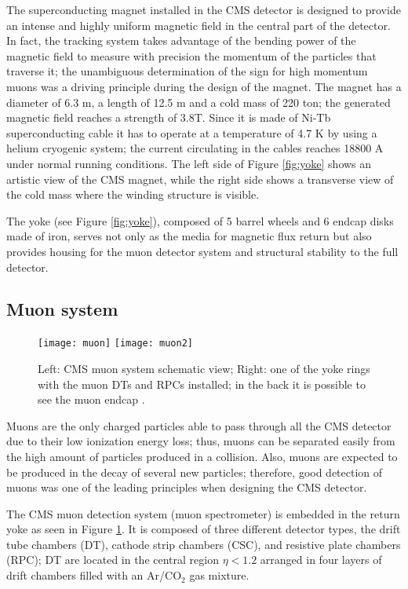 The superconducting magnet installed in the CMS detector is designed to provide an intense and highly uniform magnetic field in the central part of the detector. In fact, the tracking system takes advantage of the bending power of the magnetic field to measure with precision the momentum of the particles that traverse it; the unambiguous determination of the sign for high momentum muons was a driving principle during the design of the magnet. The magnet has a diameter of 6.3 m, a length of 12.5 m and a cold mass of 220 ton; the generated magnetic field reaches a strength of 3.8T. Since it is made of Ni-Tb superconducting cable it has to operate at a temperature of 4.7 K by using a helium cryogenic system; the current circulating in the cables reaches 18800 A under normal running conditions. The left side of Figure \ref{fig:yoke} shows an artistic view of the CMS magnet, while the right side shows a transverse view of the cold mass where the winding structure is visible.

The yoke (see Figure \ref{fig:yoke}), composed of 5 barrel wheels and 6 endcap disks made of iron, serves not only as the media for magnetic flux return but also provides housing for the muon detector system and structural stability to the full detector.     

\subsection{Muon system }

\begin{figure}[h!]
  \centering
  \texttt{[image: muon]}
  \texttt{[image: muon2]}
  \caption[CMS Muon system schematic view]{Left: CMS muon system schematic view; Right: one of the yoke rings with the muon DTs and RPCs installed; in the back it is possible to see the muon endcap \cite{muon}. }
  \label{fig:muon_chambers}
\end{figure}

Muons are the only charged particles able to pass through all the CMS detector due to their low ionization energy loss; thus, muons can be separated easily from the high amount of particles produced in a \pp collision. Also, muons are expected to be produced in the decay of several new particles; therefore, good detection of muons was one of the leading principles when designing the CMS detector.

The CMS muon detection system (muon spectrometer) is embedded in the return yoke as seen in Figure \ref{fig:muon_chambers}. It is composed of three different detector types, the drift tube chambers (DT), cathode strip chambers (CSC), and resistive plate chambers (RPC); DT are located in the central region $\eta< 1.2$ arranged in four layers of drift chambers filled with an Ar/CO$_2$ gas mixture.

